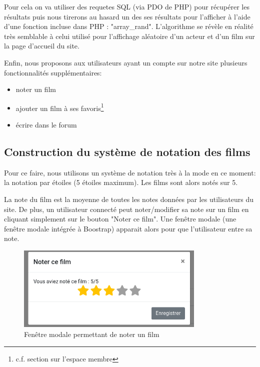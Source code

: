                 Pour cela on va utiliser des requetes SQL (via PDO de PHP) pour récupérer les résultats puis nous tirerons au hasard un des ses résultats pour l'afficher à l'aide d'une fonction incluse dans PHP : "array\_rand". L'algorithme se révèle en réalité très semblable à celui utilisé pour l'affichage aléatoire d'un acteur et d'un film sur la page d'accueil du site.

            \medskip

            Enfin, nous proposons aux utilisateurs ayant un compte sur notre site plusieurs fonctionnalités supplémentaires:
            \begin{itemize}
                \item noter un film
                \item ajouter un film à ses favoris\footnote{c.f. section sur l'espace membre}
                \item écrire dans le forum
            \end{itemize}


            \subsection{Construction du système de notation des films}

                Pour ce faire, nous utilisons un système de notation très à la mode en ce moment: la notation par étoiles (5 étoiles maximum). Les films sont alors notés sur 5.


                La note du film est la moyenne de toutes les notes données par les utilisateurs du site. De plus, un utilisateur connecté peut noter/modifier sa note sur un film en cliquant simplement sur le bouton "Noter ce film". Une fenêtre modale (une fenêtre modale intégrée à Boostrap) apparait alors pour que l'utilisateur entre sa note.

                \begin{figure}
                    \centering
                    \includegraphics[width=9cm]{img/noter-film.png}
                    \caption{Fenêtre modale permettant de noter un film}
                \end{figure}

